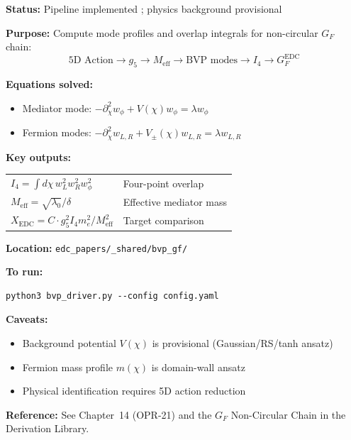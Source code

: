 
\begin{tcolorbox}[
    colback=blue!5!white,
    colframe=blue!75!black,
    title={\textbf{BVP Pipeline for $G_F$ Derivation (OPR-21)}},
    fonttitle=\bfseries
]

\textbf{Status:} Pipeline implemented \tagDer{}; physics background provisional \tagDc{}

\vspace{0.5em}
\textbf{Purpose:} Compute mode profiles and overlap integrals for non-circular $G_F$ chain:
\[
\text{5D Action} \to g_5 \to M_{\text{eff}} \to \text{BVP modes} \to I_4 \to G_F^{\text{EDC}}
\]

\textbf{Equations solved:}
\begin{itemize}[leftmargin=*, itemsep=0pt]
    \item Mediator mode: $-\partial_\chi^2 w_\phi + V(\chi) w_\phi = \lambda w_\phi$
    \item Fermion modes: $-\partial_\chi^2 w_{L,R} + V_{\pm}(\chi) w_{L,R} = \lambda w_{L,R}$
\end{itemize}

\textbf{Key outputs:}
\begin{center}
\begin{tabular}{ll}
$I_4 = \int d\chi \, w_L^2 w_R^2 w_\phi^2$ & Four-point overlap \\
$M_{\text{eff}} = \sqrt{\lambda_0}/\delta$ & Effective mediator mass \\
$X_{\text{EDC}} = C \cdot g_5^2 I_4 m_e^2 / M_{\text{eff}}^2$ & Target comparison
\end{tabular}
\end{center}

\textbf{Location:} \texttt{edc\_papers/\_shared/bvp\_gf/}

\textbf{To run:}
\begin{verbatim}
python3 bvp_driver.py --config config.yaml
\end{verbatim}

\textbf{Caveats:}
\begin{itemize}[leftmargin=*, itemsep=0pt]
    \item Background potential $V(\chi)$ is provisional (Gaussian/RS/tanh ansatz)
    \item Fermion mass profile $m(\chi)$ is domain-wall ansatz
    \item Physical identification requires 5D action reduction
\end{itemize}

\textbf{Reference:} See Chapter~14 (OPR-21) and the $G_F$ Non-Circular Chain in the Derivation Library.

\end{tcolorbox}

